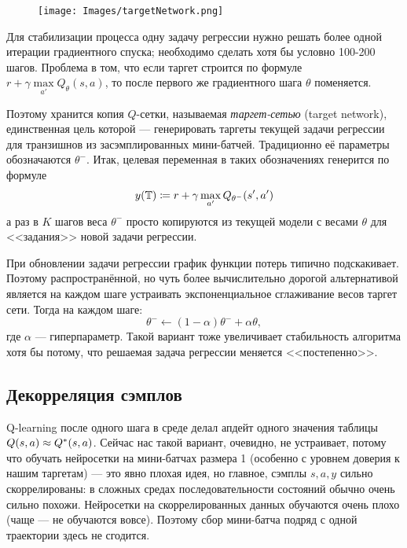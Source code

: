 \begin{wrapfigure}{r}{0.4\textwidth}
\vspace{-0.3cm}
\centering
\texttt{[image: Images/targetNetwork.png]}
\vspace{-1cm}
\end{wrapfigure}

Для стабилизации процесса одну задачу регрессии нужно решать более одной итерации градиентного спуска; необходимо сделать хотя бы условно 100-200 шагов. Проблема в том, что если таргет строится по формуле $r + \gamma \max\limits_{a'} Q_{\theta}(s, a)$, то после первого же градиентного шага $\theta$ поменяется.

Поэтому хранится копия $Q$-сетки, называемая \emph{таргет-сетью} (target network), единственная цель которой --- генерировать таргеты текущей задачи регрессии для транзишнов из засэмплированных мини-батчей. Традиционно её параметры обозначаются $\theta^{-}$. Итак, целевая переменная в таких обозначениях генерится по формуле
$$y( \mathbb{T} ) \coloneqq r + \gamma \max\limits_{a'} Q_{\theta^{-}}(s', a')$$
а раз в $K$ шагов веса $\theta^{-}$ просто копируются из текущей модели с весами $\theta$ для <<задания>> новой задачи регрессии.

\begin{remark}
При обновлении задачи регрессии график функции потерь типично подскакивает. Поэтому распространённой, но чуть более вычислительно дорогой альтернативой является на каждом шаге устраивать экспоненциальное сглаживание весов таргет сети. Тогда на каждом шаге:
$$\theta^{-} \leftarrow (1 - \alpha) \theta^{-} + \alpha \theta,$$
где $\alpha$ --- гиперпараметр. Такой вариант тоже увеличивает стабильность алгоритма хотя бы потому, что решаемая задача регрессии меняется <<постепенно>>.
\end{remark}

\subsection{Декорреляция сэмплов}

Q-learning после одного шага в среде делал апдейт одного значения таблицы $Q(s, a) \HM \approx Q^*(s, a)$. Сейчас нас такой вариант, очевидно, не устраивает, потому что обучать нейросетки на мини-батчах размера 1 (особенно с уровнем доверия к нашим таргетам) --- это явно плохая идея, но главное, сэмплы $s, a, y$ сильно скоррелированы: в сложных средах последовательности состояний обычно очень сильно похожи. Нейросетки на скоррелированных данных обучаются очень плохо (чаще --- не обучаются вовсе). Поэтому сбор мини-батча подряд с одной траектории здесь не сгодится.

